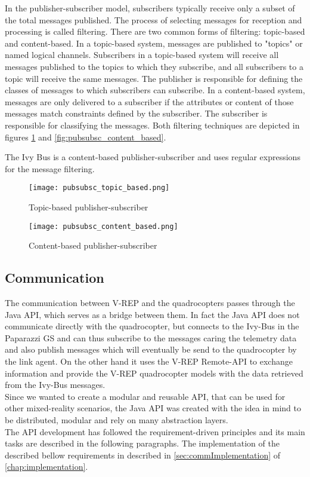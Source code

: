 In the publisher-subscriber model, subscribers typically receive only a subset of the total messages published. The process of selecting messages for reception and processing is called filtering. There are two common forms of filtering: topic-based and content-based.
In a topic-based system, messages are published to "topics" or named logical channels. Subscribers in a topic-based system will receive all messages published to the topics to which they subscribe, and all subscribers to a topic will receive the same messages. The publisher is responsible for defining the classes of messages to which subscribers can subscribe.
In a content-based system, messages are only delivered to a subscriber if the attributes or content of those messages match constraints defined by the subscriber. The subscriber is responsible for classifying the messages. Both filtering techniques are depicted in figures \ref{fig:pubsubsc_topic_based} and \ref{fig:pubsubsc_content_based}.

The Ivy Bus is a content-based publisher-subscriber and uses regular expressions for the message filtering.

\begin{figure}[!tbp]
  \centering
  \begin{minipage}[b]{0.4\textwidth}
    \texttt{[image: pubsubsc\_topic\_based.png]}
    \caption{Topic-based publisher-subscriber \label{fig:pubsubsc_content_based}}
  \end{minipage}
  \hfill
  \begin{minipage}[b]{0.4\textwidth}
    \texttt{[image: pubsubsc\_content\_based.png]}
    \caption{Content-based publisher-subscriber \label{fig:pubsubsc_topic_based}}
  \end{minipage}
\end{figure}

\subsection{Communication}
\label{sec:communication}

The communication between V-REP and the quadrocopters passes through the Java API, which serves as a bridge between them. In fact the Java API does not communicate directly with the quadrocopter, but connects to the Ivy-Bus in the Paparazzi GS and can thus subscribe to the messages caring the telemetry data and also publish messages which will eventually be send to the quadrocopter by the link agent. On the other hand it uses the V-REP Remote-API to exchange information and provide the V-REP quadrocopter models with the data retrieved from the Ivy-Bus messages.\\ 
Since we wanted to create a modular and reusable API, that can be used for other mixed-reality scenarios, the Java API was created with the idea in mind to be distributed, modular and rely on many abstraction layers.\\ 
The API development has followed the requirement-driven principles and its main tasks are described in the following paragraphs. The implementation of the described bellow requirements in described in \ref{sec:commImplementation} of \ref{chap:implementation}.

